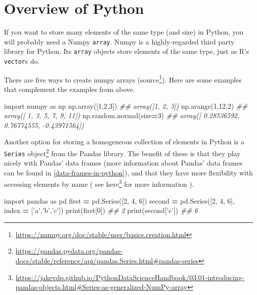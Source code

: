 \documentclass[12pt,krantz2]{krantz}
\makeatletter
\newenvironment{Shaded}{\begin{snugshade}}{\end{snugshade}}
\newcommand{\BuiltInTok}[1]{#1}
\newcommand{\CommentTok}[1]{\textcolor[rgb]{0.37,0.37,0.37}{\textit{#1}}}
\newcommand{\DecValTok}[1]{\textcolor[rgb]{0.06,0.06,0.06}{#1}}
\newcommand{\ImportTok}[1]{#1}
\newcommand{\NormalTok}[1]{#1}
\newcommand{\OperatorTok}[1]{\textcolor[rgb]{0.43,0.43,0.43}{\textbf{#1}}}
\newcommand{\StringTok}[1]{\textcolor[rgb]{0.5,0.5,0.5}{#1}}
\renewcommand{\href}[2]{#2\footnote{\url{#1}}}
\newenvironment{kframe}{%
\medskip{}
\setlength{\fboxsep}{.8em}
 \def\at@end@of@kframe{}%
 \ifinner\ifhmode%
  \def\at@end@of@kframe{\end{minipage}}%
  \begin{minipage}{\columnwidth}%
 \fi\fi%
 \def\FrameCommand##1{\hskip\@totalleftmargin \hskip-\fboxsep
 \colorbox{shadecolor}{##1}\hskip-\fboxsep
     \hskip-\linewidth \hskip-\@totalleftmargin \hskip\columnwidth}%
 \MakeFramed {\advance\hsize-\width
   \@totalleftmargin\z@ \linewidth\hsize
   \@setminipage}}%
 {\par\unskip\endMakeFramed%
 \at@end@of@kframe}
\renewenvironment{Shaded}{\begin{kframe}}{\end{kframe}}
\makeatother
\begin{document}
\hypertarget{overview-of-python}{%
\section{Overview of Python}\label{overview-of-python}}

If you want to store many elements of the same type (and size) in Python, you will probably need a Numpy \texttt{array}. Numpy is a highly-regarded third party library \citep{harris2020array} for Python. Its \texttt{array} objects store elements of the same type, just as R's \texttt{vector}s do.

There are five ways to create numpy arrays (\href{https://numpy.org/doc/stable/user/basics.creation.html}{source}). Here are some examples that complement the examples from above.

\begin{Shaded}
\begin{Highlighting}[]
\ImportTok{import}\NormalTok{ numpy }\ImportTok{as}\NormalTok{ np   }
\NormalTok{np.array([}\DecValTok{1}\NormalTok{,}\DecValTok{2}\NormalTok{,}\DecValTok{3}\NormalTok{])}
\CommentTok{## array([1, 2, 3])}
\NormalTok{np.arange(}\DecValTok{1}\NormalTok{,}\DecValTok{12}\NormalTok{,}\DecValTok{2}\NormalTok{)}
\CommentTok{## array([ 1,  3,  5,  7,  9, 11])}
\NormalTok{np.random.normal(size}\OperatorTok{=}\DecValTok{3}\NormalTok{)}
\CommentTok{## array([ 0.28536592,  0.76774555, -0.43971564])}
\end{Highlighting}
\end{Shaded}

Another option for storing a homogeneous collection of elements in Python is a \href{https://pandas.pydata.org/pandas-docs/stable/reference/api/pandas.Series.html\#pandas-series}{\texttt{Series} object} from the Pandas library. The benefit of these is that they play nicely with Pandas' data frames (more information about Pandas' data frames can be found in \ref{data-frames-in-python}), and that they have more flexibility with accessing elements by name ( see \href{https://jakevdp.github.io/PythonDataScienceHandbook/03.01-introducing-pandas-objects.html\#Series-as-generalized-NumPy-array}{here} for more information ).

\begin{Shaded}
\begin{Highlighting}[]
\ImportTok{import}\NormalTok{ pandas }\ImportTok{as}\NormalTok{ pd}
\NormalTok{first }\OperatorTok{=}\NormalTok{ pd.Series([}\DecValTok{2}\NormalTok{, }\DecValTok{4}\NormalTok{, }\DecValTok{6}\NormalTok{])}
\NormalTok{second }\OperatorTok{=}\NormalTok{ pd.Series([}\DecValTok{2}\NormalTok{, }\DecValTok{4}\NormalTok{, }\DecValTok{6}\NormalTok{], index }\OperatorTok{=}\NormalTok{ [}\StringTok{'a'}\NormalTok{,}\StringTok{'b'}\NormalTok{,}\StringTok{'c'}\NormalTok{])}
\BuiltInTok{print}\NormalTok{(first[}\DecValTok{0}\NormalTok{])}
\CommentTok{## 2}
\BuiltInTok{print}\NormalTok{(second[}\StringTok{'c'}\NormalTok{])}
\CommentTok{## 6}
\end{Highlighting}
\end{Shaded}
\end{document}
